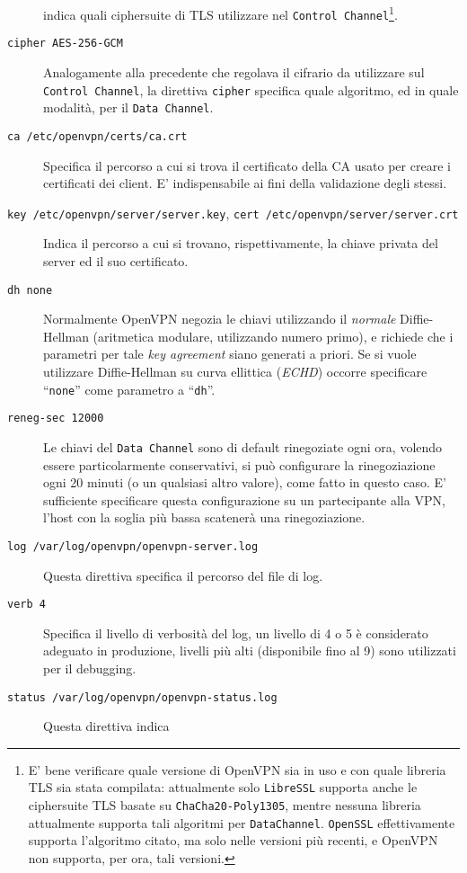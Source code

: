 \begin{description}
	indica quali ciphersuite di TLS utilizzare nel \texttt{Control Channel}\footnote{E' bene
		verificare quale versione di OpenVPN sia in uso e con quale libreria TLS sia
		stata compilata: attualmente solo \texttt{LibreSSL} supporta anche le ciphersuite TLS
		basate su \texttt{ChaCha20-Poly1305}, mentre nessuna libreria attualmente supporta
		tali algoritmi per \texttt{DataChannel}. \texttt{OpenSSL} effettivamente supporta
		l'algoritmo citato, ma solo nelle versioni più recenti, e OpenVPN non supporta, per ora,
	tali versioni.}.
	\item[\texttt{cipher AES-256-GCM}]Analogamente alla precedente che regolava il cifrario
	da utilizzare sul \texttt{Control Channel}, la direttiva \texttt{cipher} specifica
	quale algoritmo, ed in quale modalità, per il \texttt{Data Channel}.
	\item[\texttt{ca /etc/openvpn/certs/ca.crt}]Specifica il percorso a cui si trova
	il certificato della CA usato per creare i certificati dei client. E' indispensabile
	ai fini della validazione degli stessi.
	\item[\texttt{key /etc/openvpn/server/server.key}, \texttt{cert /etc/openvpn/server/server.crt}]
	Indica il percorso a cui si trovano,
	rispettivamente, la chiave privata del server ed il suo certificato.
	\item[\texttt{dh none}]Normalmente OpenVPN negozia le chiavi utilizzando il \textit{normale}
	Diffie-Hellman (aritmetica modulare, utilizzando numero primo), e richiede che i parametri
	per tale \textit{key agreement} siano generati a priori. Se si vuole utilizzare
	Diffie-Hellman su curva ellittica (\textit{ECHD}) occorre specificare ``\texttt{none}''
	come parametro a ``\texttt{dh}''.
	\item[\texttt{reneg-sec 12000}]Le chiavi del \texttt{Data Channel} sono di default rinegoziate
	ogni ora, volendo essere particolarmente conservativi, si può configurare
	la rinegoziazione ogni 20 minuti (o un qualsiasi altro valore), come fatto in
	questo caso. E' sufficiente specificare questa configurazione su un partecipante
	alla VPN, l'host con la soglia più bassa scatenerà una rinegoziazione.
	\item[\texttt{log /var/log/openvpn/openvpn-server.log}]Questa direttiva specifica
	il percorso del file di log.
	\item[\texttt{verb 4}]Specifica il livello di verbosità del log, un livello di
	4 o 5 è considerato adeguato in produzione, livelli più alti (disponibile fino al 9)
	sono utilizzati per il debugging.
	\item[\texttt{status /var/log/openvpn/openvpn-status.log}]Questa direttiva indica

\end{description}
